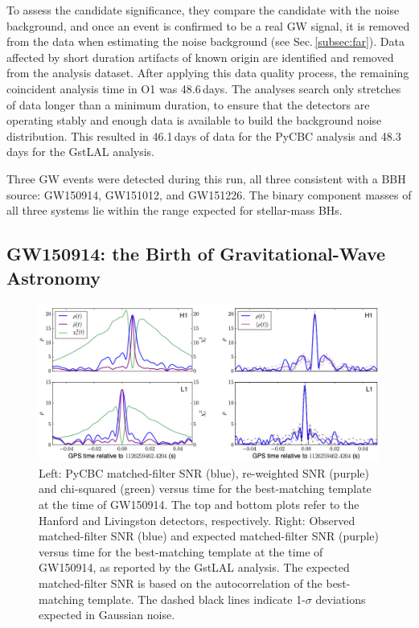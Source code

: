 \documentclass[binding=0.6cm, LaM]{sapthesis}
\begin{document}
	To assess the candidate significance, they compare the candidate with the noise background, 
	and once an event is confirmed to be a real GW signal, 
	it is removed from the data when estimating the noise background (see Sec.\,\ref{subsec:far}).
	Data affected by short duration artifacts of known origin are identified and removed from the analysis dataset.
	After applying this data quality process, the remaining coincident analysis time in O1 was 48.6\,days. 
	The analyses search only stretches of data longer than a minimum duration, 
	to ensure that the detectors are operating stably and enough data is available to build the background noise distribution.  
	This resulted in 46.1\,days of data for the {\ttfamily PyCBC} analysis and 48.3\,days for the {\ttfamily GstLAL} analysis.

	Three GW events were detected during this run, all three consistent with a BBH source: GW150914, GW151012, and GW151226.
	The binary component masses of all three systems lie 
	within the range expected for stellar-mass BHs. 

\subsection{GW150914: the Birth of Gravitational-Wave Astronomy}
\label{subsec:GW150914}
		\begin{figure}[!t]
                	\label{firstgw}
                	\includegraphics[scale=0.45]{firstgw}
                	\centering
                	\caption{Left: {\ttfamily PyCBC} matched-filter SNR (blue), re-weighted SNR (purple) and chi-squared (green) versus time for the best-matching template at the time of GW150914. The top and bottom plots refer to the Hanford and Livingston detectors, respectively. Right: Observed matched-filter SNR (blue) and expected matched-filter SNR (purple) versus time for the best-matching template at the time of GW150914, as reported by the {\ttfamily GstLAL} analysis. The expected matched-filter SNR is based on the autocorrelation of the best-matching template. The dashed black lines indicate 1-$\sigma$ deviations expected in Gaussian noise. \cite{21}} 
                	\label{fig:firstgw}
                \end{figure}
\end{document}
